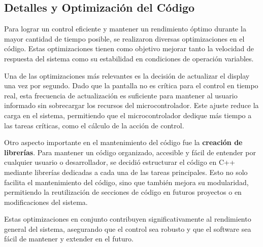 \subsection{Detalles y Optimización del Código}
Para lograr un control eficiente y mantener un rendimiento óptimo durante la mayor cantidad de tiempo posible, se realizaron diversas optimizaciones en el código. Estas optimizaciones tienen como objetivo mejorar tanto la velocidad de respuesta del sistema como su estabilidad en condiciones de operación variables. \par
Una de las optimizaciones más relevantes es la decisión de actualizar el display una vez por segundo. Dado que la pantalla no es crítica para el control en tiempo real, esta frecuencia de actualización es suficiente para mantener al usuario informado sin sobrecargar los recursos del microcontrolador. Este ajuste reduce la carga en el sistema, permitiendo que el microcontrolador dedique más tiempo a las tareas críticas, como el cálculo de la acción de control.\par
Otro aspecto importante en el mantenimiento del código fue la \textbf{creación de librerías}. Para mantener un código organizado, accesible y fácil de entender por cualquier usuario o desarrollador, se decidió estructurar el código en C++ mediante librerías dedicadas a cada una de las tareas principales. Esto no solo facilita el mantenimiento del código, sino que también mejora su modularidad, permitiendo la reutilización de secciones de código en futuros proyectos o en modificaciones del sistema. \par
Estas optimizaciones en conjunto contribuyen significativamente al rendimiento general del sistema, asegurando que el control sea robusto y que el software sea fácil de mantener y extender en el futuro.\par
